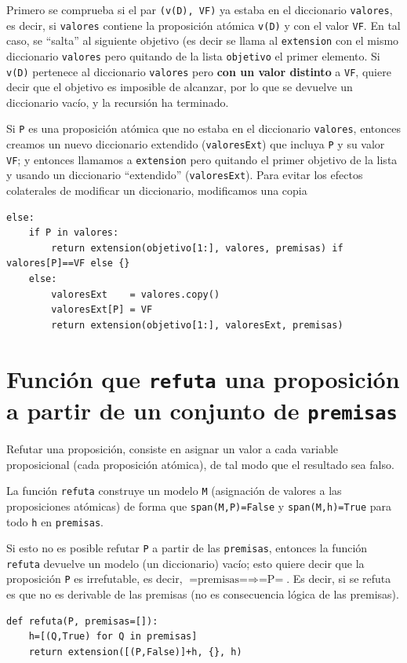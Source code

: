 \documentclass[10pt,a4paper]{report}
\begin{document}
Primero se comprueba si el par \texttt{(v(D), VF)} ya estaba en el diccionario \texttt{valores}, es decir, si \texttt{valores} contiene la proposición atómica \texttt{v(D)} y con el valor \texttt{VF}.
En tal caso, se ``salta'' al siguiente objetivo (es decir se llama al \texttt{extension} con el mismo diccionario \texttt{valores} pero quitando de la lista \texttt{objetivo} el primer elemento.
Si \texttt{v(D)} pertenece al diccionario \texttt{valores} pero \textbf{con un valor distinto} a \texttt{VF}, quiere decir que el objetivo es imposible de alcanzar, por lo que se devuelve un diccionario vacío, y la recursión ha terminado.

Si \texttt{P} es una proposición atómica que no estaba en el diccionario \texttt{valores}, entonces creamos un nuevo diccionario extendido (\texttt{valoresExt}) que incluya \texttt{P} y su valor \texttt{VF}; y entonces llamamos a \texttt{extension} pero quitando el primer objetivo de la lista y usando un diccionario ``extendido'' (\texttt{valoresExt}).
Para evitar los efectos colaterales de modificar un diccionario, modificamos una copia

\begin{verbatim}
else:
    if P in valores:
        return extension(objetivo[1:], valores, premisas) if valores[P]==VF else {}
    else:
        valoresExt    = valores.copy()
        valoresExt[P] = VF
        return extension(objetivo[1:], valoresExt, premisas)
\end{verbatim}
\chapter{Función que \texttt{refuta} una proposición a partir de un conjunto de \texttt{premisas}}
\label{sec:orgd9997d9}

Refutar una proposición, consiste en asignar un valor a cada variable proposicional (cada proposición atómica), de tal modo que el resultado sea falso.

La función \texttt{refuta} construye un modelo \texttt{M} (asignación de valores a las proposiciones atómicas) de forma que \texttt{span(M,P)=False} y \texttt{span(M,h)=True} para todo \texttt{h} en \texttt{premisas}.

Si esto no es posible refutar \texttt{P} a partir de las \texttt{premisas}, entonces la función \texttt{refuta} devuelve un modelo (un diccionario) vacío; esto quiere decir que la proposición \texttt{P} es irrefutable, es decir, \(\text{=premisas=}\Rightarrow\text{=P=}\).
Es decir, si se refuta es que no es derivable de las premisas (no es consecuencia lógica de las premisas).
\begin{verbatim}
def refuta(P, premisas=[]):
    h=[(Q,True) for Q in premisas]
    return extension([(P,False)]+h, {}, h)

\end{verbatim}
\end{document}
